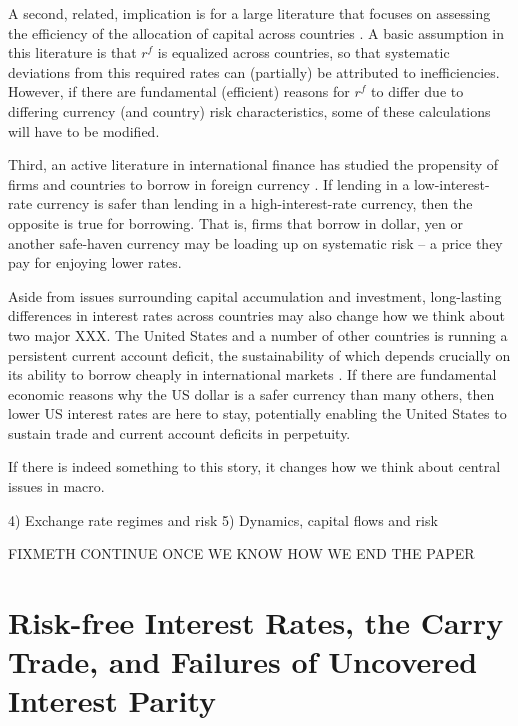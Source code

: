 \documentclass{ar-1col}
\begin{document}
A second, related, implication is for a large literature that focuses on assessing the efficiency of the allocation of capital across countries \citep{HallJones1997, CaselliFeyrer2007}. A basic assumption in this literature is that $r^f$ is equalized across countries, so that systematic deviations from this required rates can (partially) be attributed to inefficiencies. However, if there are fundamental (efficient) reasons for $r^f$ to differ due to differing currency (and country) risk characteristics, some of these calculations will have to be modified.

Third, an active literature in international finance has studied the propensity of firms and countries to borrow in foreign currency \citep{DuSchreger2016, KalemliOzcanetal2019}. If lending in a low-interest-rate currency is safer than lending in a high-interest-rate currency, then the opposite is true for borrowing. That is, firms that borrow in dollar, yen or another safe-haven currency may be loading up on systematic risk -- a price they pay for enjoying lower rates.

Aside from issues surrounding capital accumulation and investment, long-lasting differences in interest rates across countries may also change how we think about two major XXX. The United States and a number of other countries is running a persistent current account deficit, the sustainability of which depends crucially on its ability to borrow cheaply in international markets \citep{GourinchasRey2007}. If there are fundamental economic reasons why the US dollar is a safer currency than many others, then lower US interest rates are here to stay, potentially enabling the United States to sustain trade and current account deficits in perpetuity.

If there is indeed something to this story, it changes how we think
about central issues in macro.

 4) Exchange rate regimes and risk 5)
Dynamics, capital flows and risk

FIXMETH CONTINUE ONCE WE KNOW HOW WE END THE PAPER

\section{Risk-free Interest Rates, the Carry Trade, and Failures of Uncovered Interest Parity}
\end{document}
